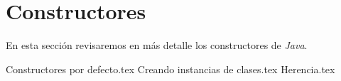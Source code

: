 \section{Constructores}
  En esta sección revisaremos en más detalle los constructores de \textit{Java}.

  {Constructores por defecto.tex}
  {Creando instancias de clases.tex}
  {Herencia.tex}
%